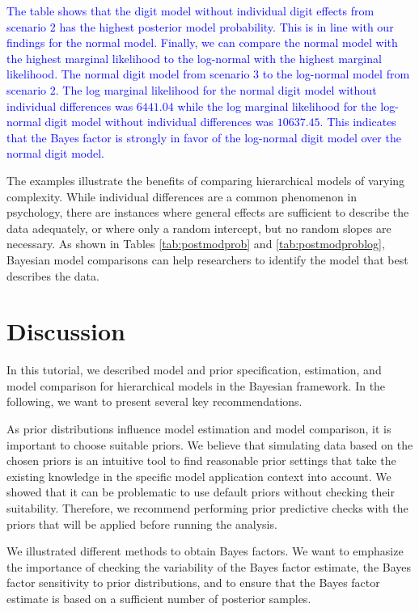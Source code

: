 \documentclass[
  english,
  doc,floatsintext]{apa6}
\begin{document}
\textcolor{blue}{The table shows that the digit model without individual digit effects from scenario 2 has the highest posterior model probability. This is in line with our findings for the normal model. Finally, we can compare the normal model with the highest marginal likelihood to the log-normal with the highest marginal likelihood. The normal digit model from scenario 3 to the log-normal model from scenario 2. The log marginal likelihood for the normal digit model without individual differences was $6441.04$ while the log marginal likelihood for the log-normal digit model without individual differences was $10637.45$. This indicates that the Bayes factor is strongly in favor of the log-normal digit model over the normal digit model.}

The examples illustrate the benefits of comparing hierarchical models of varying complexity. While individual differences are a common phenomenon in psychology, there are instances where general effects are sufficient to describe the data adequately, or where only a random intercept, but no random slopes are necessary. As shown in Tables \ref{tab:postmodprob} and \ref{tab:postmodproblog}, Bayesian model comparisons can help researchers to identify the model that best describes the data.

\hypertarget{discussion}{%
\section{Discussion}\label{discussion}}

In this tutorial, we described model and prior specification, estimation, and model comparison for hierarchical models in the Bayesian framework. In the following, we want to present several key recommendations.

As prior distributions influence model estimation and model comparison, it is important to choose suitable priors. We believe that simulating data based on the chosen priors is an intuitive tool to find reasonable prior settings that take the existing knowledge in the specific model application context into account. We showed that it can be problematic to use default priors without checking their suitability. Therefore, we recommend performing prior predictive checks with the priors that will be applied before running the analysis.

We illustrated different methods to obtain Bayes factors. We want to emphasize the importance of checking the variability of the Bayes factor estimate, the Bayes factor sensitivity to prior distributions, and to ensure that the Bayes factor estimate is based on a sufficient number of posterior samples.
\end{document}
